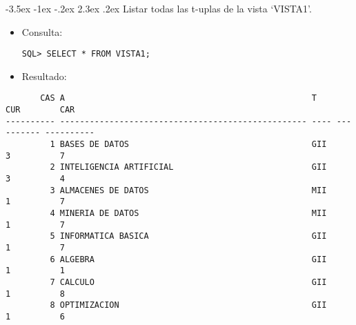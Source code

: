 \documentclass[11pt]{report}
\makeatletter
\renewcommand\chapter{\@startsection{chapter}{0}{\z@}%
    {-3.5ex \@plus -1ex \@minus -.2ex}%
    {2.3ex \@plus.2ex}%
    {\normalfont\Large\bfseries}}
\makeatother
\begin{document}
\chapter{Listar todas las t-uplas de la vista ‘VISTA1’.}
\begin{itemize}
  \item Consulta:
  \begin{verbatim}
SQL> SELECT * FROM VISTA1;
  \end{verbatim}

  \newpage

  \item{Resultado:}
\end{itemize}
  \begin{verbatim}
       CAS A                                                  T           CUR        CAR                                                                                                                
---------- -------------------------------------------------- ---- ---------- ----------                                                                                                                
         1 BASES DE DATOS                                     GII           3          7                                                                                                                
         2 INTELIGENCIA ARTIFICIAL                            GII           3          4                                                                                                                
         3 ALMACENES DE DATOS                                 MII           1          7                                                                                                                
         4 MINERIA DE DATOS                                   MII           1          7                                                                                                                
         5 INFORMATICA BASICA                                 GII           1          7                                                                                                                
         6 ALGEBRA                                            GII           1          1                                                                                                                
         7 CALCULO                                            GII           1          8                                                                                                                
         8 OPTIMIZACION                                       GII           1          6                                                                                                                

\end{verbatim}
\end{document}
